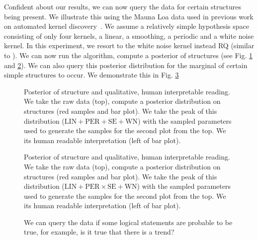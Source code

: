Confident about our results, we can now query the data for certain structures being present. We illustrate this using the Mauna Loa data used in previous work on automated kernel discovery~\citep{duvenaud2013structure}. We assume a relatively simple hypothesis space  consisting of only four kernels, a linear, a smoothing, a periodic and a white noise kernel. In this experiment, we resort to the white noise kernel instead RQ (similar to \citep{lloyd2014automatic}).  We can now run the algorithm, compute a posterior of structures (see Fig. \ref{fig:posterior} and \ref{fig:posterior_airline}). We can also query this posterior distribution for the marginal of certain simple structures to occur. We demonstrate this in Fig. \ref{fig:query}
\begin{figure}
\centering

\caption{Posterior of structure and qualitative, human interpretable reading. We take the raw data (top), compute a posterior distribution on structures (red samples and bar plot).
We take the peak of this distribution ($\text{LIN}+\text{PER}+\text{SE}+\text{WN}$) with the sampled parameters used to generate the samples for the second plot from the top. We  its human readable interpretation (left of bar plot).}\label{fig:posterior}
\end{figure}

\begin{figure}
\centering

\caption{Posterior of structure and qualitative, human interpretable reading. We take the raw data (top), compute a posterior distribution on structures (red samples and bar plot).
We take the peak of this distribution ($\text{LIN}+\text{PER} \times \text{SE}+\text{WN}$) with the sampled parameters used to generate the samples for the second plot from the top. We  its human readable interpretation (left of bar plot).}\label{fig:posterior_airline}
\end{figure}

\begin{figure}
\centering

\caption{We can query the data if some logical statements are probable to be true, for example, is it true that there is a trend?}\label{fig:query}
\end{figure}